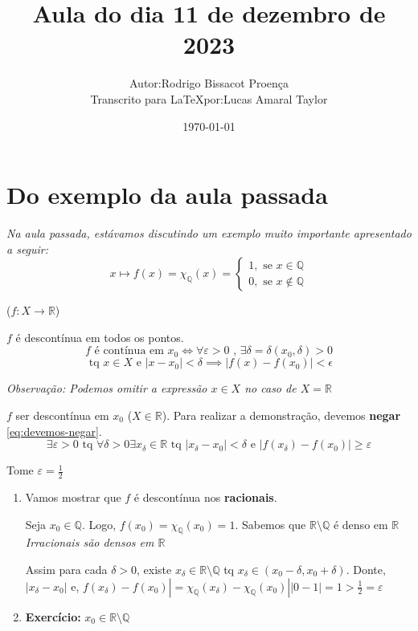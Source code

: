 \documentclass[12pt]{article}
\title{Aula do dia 11 de dezembro de 2023}
\author{
    \begin{tabular}{rl}
        Autor: & Rodrigo Bissacot Proença \\
        Transcrito para \LaTeX por: & Lucas Amaral Taylor
    \end{tabular}
}
\date{\today}
\begin{document}
    \maketitle
    \section*{Do exemplo da aula passada}
    \textit{Na aula passada, estávamos discutindo um exemplo muito importante apresentado a seguir: }
    \begin{equation*}
        x \longmapsto f(x) = \chi_{\mathbb{Q}}(x) = \left\{ 
        \begin{array}{l}
            1, \text{ se } x \in \mathbb{Q}\\
            0, \text{ se } x \notin \mathbb{Q}
        \end{array}
        \right.
    \end{equation*}
    
    ($f: X \to \mathbb{R}$)
    
    $f$ é descontínua em todos os pontos. 
    \begin{equation}
        f \text{ é contínua em } x_0 \iff \forall \varepsilon > 0 \text{ , } \exists \delta = \delta(x_0, \delta) > 0 
        \label{eq:devemos-negar}
    \end{equation}
    \begin{equation*}
        \text{ tq } x \in X \text{ e } |x - x_0| < \delta \implies |f(x) - f(x_0)| < \epsilon
    \end{equation*}

    \textit{Observação: Podemos omitir a expressão $x \in X$ no caso de $X = \mathbb{R}$}
    
    $f$ ser descontínua em $x_0$ ($X \in \mathbb{R}$). Para realizar a demonstração, devemos \textbf{negar} \ref{eq:devemos-negar}. 
    \begin{equation}
        \exists \varepsilon > 0 \text{ tq } \forall \delta > 0 \exists x_\delta \in \mathbb{R} \text{ tq } |x_\delta - x_0| < \delta \text{ e } |f(x_\delta) - f(x_0)| \geq \varepsilon  
    \end{equation}

    Tome $\varepsilon = \frac{1}{2}$
    \begin{enumerate}
        \item Vamos mostrar que $f$ é descontínua nos \textbf{racionais}.
        
        Seja $x_0 \in \mathbb{Q}$. Logo, $f(x_0) = \chi_\mathbb{Q}(x_0) = 1$. Sabemos que $\mathbb{R} \setminus \mathbb{Q}$ é denso em $\mathbb{R}$ \textit{Irracionais são densos em $\mathbb{R}$}

        Assim para cada $\delta > 0$, existe $x_\delta \in \mathbb{R} \setminus \mathbb{Q}$ tq $x_\delta \in (x_0 - \delta, x_0 + \delta)$. Donte, $|x_\delta - x_0|$ e, $f(x_\delta) - f(x_0)| = \chi_\mathbb{Q}(x_\delta) - \chi_\mathbb{Q}(x_0)| | 0 - 1| = 1 > \frac{1}{2} = \varepsilon$

        \item \textbf{Exercício: } $x_0 \in \mathbb{R} \setminus \mathbb{Q}$
    \end{enumerate}
\end{document}

